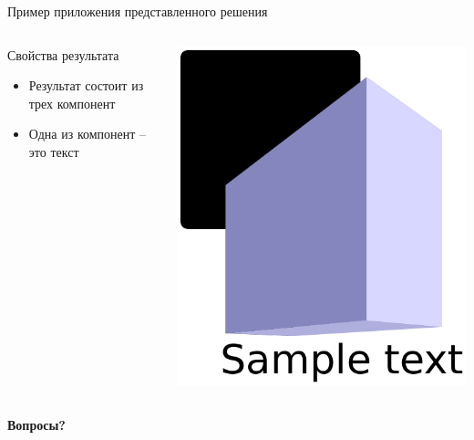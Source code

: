 \documentclass{beamer}
\begin{document}
\begin{frame}{Пример приложения представленного решения}
  \begin{columns}
    \begin{column}{0.5\linewidth}
      \begin{block}{Свойства результата}
        \begin{itemize}
        \item Результат состоит из трех компонент
        \item Одна из компонент -- это текст
        \end{itemize}
      \end{block}
    \end{column}
    \begin{column}{0.45\linewidth}
      \includegraphics[width=0.9\linewidth]{fig1.pdf}
    \end{column}
  \end{columns}

\end{frame}


\begin{frame}
  \vfill
  \centering
  \Large\bfseries Вопросы?
  \vfill
\end{frame}
\end{document}
